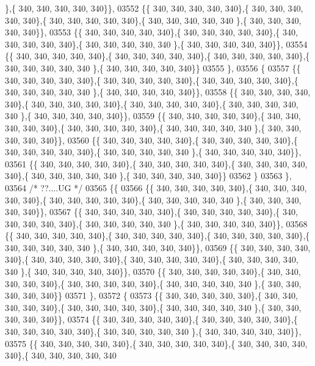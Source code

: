 \begin{DoxyCode}
      \},\{ 340, 340, 340, 340, 340\}\},
03552 \{\{ 340, 340, 340, 340, 340\},\{ 340, 340, 340, 340, 340\},\{ 340, 340, 340, 340, 340\},\{ 340, 340, 340, 340, 340
      \},\{ 340, 340, 340, 340, 340\}\},
03553 \{\{ 340, 340, 340, 340, 340\},\{ 340, 340, 340, 340, 340\},\{ 340, 340, 340, 340, 340\},\{ 340, 340, 340, 340, 340
      \},\{ 340, 340, 340, 340, 340\}\},
03554 \{\{ 340, 340, 340, 340, 340\},\{ 340, 340, 340, 340, 340\},\{ 340, 340, 340, 340, 340\},\{ 340, 340, 340, 340, 340
      \},\{ 340, 340, 340, 340, 340\}\}
03555 \},
03556 \{
03557 \{\{ 340, 340, 340, 340, 340\},\{ 340, 340, 340, 340, 340\},\{ 340, 340, 340, 340, 340\},\{ 340, 340, 340, 340, 340
      \},\{ 340, 340, 340, 340, 340\}\},
03558 \{\{ 340, 340, 340, 340, 340\},\{ 340, 340, 340, 340, 340\},\{ 340, 340, 340, 340, 340\},\{ 340, 340, 340, 340, 340
      \},\{ 340, 340, 340, 340, 340\}\},
03559 \{\{ 340, 340, 340, 340, 340\},\{ 340, 340, 340, 340, 340\},\{ 340, 340, 340, 340, 340\},\{ 340, 340, 340, 340, 340
      \},\{ 340, 340, 340, 340, 340\}\},
03560 \{\{ 340, 340, 340, 340, 340\},\{ 340, 340, 340, 340, 340\},\{ 340, 340, 340, 340, 340\},\{ 340, 340, 340, 340, 340
      \},\{ 340, 340, 340, 340, 340\}\},
03561 \{\{ 340, 340, 340, 340, 340\},\{ 340, 340, 340, 340, 340\},\{ 340, 340, 340, 340, 340\},\{ 340, 340, 340, 340, 340
      \},\{ 340, 340, 340, 340, 340\}\}
03562 \}
03563 \},
03564 \textcolor{comment}{/* ??....UG */}
03565 \{\{
03566 \{\{ 340, 340, 340, 340, 340\},\{ 340, 340, 340, 340, 340\},\{ 340, 340, 340, 340, 340\},\{ 340, 340, 340, 340, 340
      \},\{ 340, 340, 340, 340, 340\}\},
03567 \{\{ 340, 340, 340, 340, 340\},\{ 340, 340, 340, 340, 340\},\{ 340, 340, 340, 340, 340\},\{ 340, 340, 340, 340, 340
      \},\{ 340, 340, 340, 340, 340\}\},
03568 \{\{ 340, 340, 340, 340, 340\},\{ 340, 340, 340, 340, 340\},\{ 340, 340, 340, 340, 340\},\{ 340, 340, 340, 340, 340
      \},\{ 340, 340, 340, 340, 340\}\},
03569 \{\{ 340, 340, 340, 340, 340\},\{ 340, 340, 340, 340, 340\},\{ 340, 340, 340, 340, 340\},\{ 340, 340, 340, 340, 340
      \},\{ 340, 340, 340, 340, 340\}\},
03570 \{\{ 340, 340, 340, 340, 340\},\{ 340, 340, 340, 340, 340\},\{ 340, 340, 340, 340, 340\},\{ 340, 340, 340, 340, 340
      \},\{ 340, 340, 340, 340, 340\}\}
03571 \},
03572 \{
03573 \{\{ 340, 340, 340, 340, 340\},\{ 340, 340, 340, 340, 340\},\{ 340, 340, 340, 340, 340\},\{ 340, 340, 340, 340, 340
      \},\{ 340, 340, 340, 340, 340\}\},
03574 \{\{ 340, 340, 340, 340, 340\},\{ 340, 340, 340, 340, 340\},\{ 340, 340, 340, 340, 340\},\{ 340, 340, 340, 340, 340
      \},\{ 340, 340, 340, 340, 340\}\},
03575 \{\{ 340, 340, 340, 340, 340\},\{ 340, 340, 340, 340, 340\},\{ 340, 340, 340, 340, 340\},\{ 340, 340, 340, 340, 340

\end{DoxyCode}
